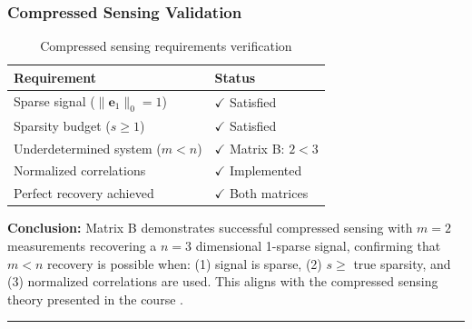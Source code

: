 \vspace{0.5em}

\noindent{}

\vspace{1em}

\subsubsection*{Compressed Sensing Validation}

\begin{table}[h]
\centering
\begin{tabular}{ll}
\toprule
\textbf{Requirement} & \textbf{Status} \\
\midrule
Sparse signal ($\|\mathbf{e}_1\|_0 = 1$) & $\checkmark$ Satisfied \\
Sparsity budget ($s \geq 1$) & $\checkmark$ Satisfied \\
Underdetermined system ($m < n$) & $\checkmark$ Matrix B: $2 < 3$ \\
Normalized correlations & $\checkmark$ Implemented \\
Perfect recovery achieved & $\checkmark$ Both matrices \\
\bottomrule
\end{tabular}
\caption{Compressed sensing requirements verification}
\end{table}

\textbf{Conclusion:} Matrix B demonstrates successful compressed sensing with $m=2$ measurements recovering a $n=3$ dimensional 1-sparse signal, confirming that $m < n$ recovery is possible when: (1) signal is sparse, (2) $s \geq$ true sparsity, and (3) normalized correlations are used. This aligns with the compressed sensing theory presented in the course \cite{panchenko_448_notes}.

\vspace{2em}
\noindent\rule{\textwidth}{0.4pt}
